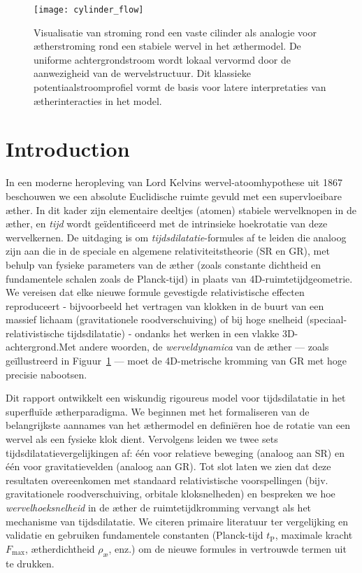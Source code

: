 \begin{figure}[htbp]
    \centering
    \texttt{[image: cylinder\_flow]}
    \caption{Visualisatie van stroming rond een vaste cilinder als analogie voor ætherstroming rond een stabiele wervel in het æthermodel. De uniforme achtergrondstroom wordt lokaal vervormd door de aanwezigheid van de wervelstructuur. Dit klassieke potentiaalstroomprofiel vormt de basis voor latere interpretaties van ætherinteracties in het model.}
    \label{fig:cylinderflow}
\end{figure}

\section{Introduction}
In een moderne heropleving van Lord Kelvins wervel-atoomhypothese uit 1867~\cite{Kelvin1867-vortex} beschouwen we een absolute Euclidische ruimte gevuld met een supervloeibare æther. In dit kader zijn elementaire deeltjes (atomen) stabiele wervelknopen in de æther, en \emph{tijd} wordt geïdentificeerd met de intrinsieke hoekrotatie van deze wervelkernen. De uitdaging is om \emph{tijdsdilatatie}-formules af te leiden die analoog zijn aan die in de speciale en algemene relativiteitstheorie (SR en GR), met behulp van fysieke parameters van de æther (zoals constante dichtheid en fundamentele schalen zoals de Planck-tijd) in plaats van 4D-ruimtetijdgeometrie. We vereisen dat elke nieuwe formule gevestigde relativistische effecten reproduceert - bijvoorbeeld het vertragen van klokken in de buurt van een massief lichaam (gravitationele roodverschuiving) of bij hoge snelheid (speciaal-relativistische tijdsdilatatie) - ondanks het werken in een vlakke 3D-achtergrond.Met andere woorden, de \emph{werveldynamica} van de æther — zoals geïllustreerd in Figuur~\ref{fig:cylinderflow} — moet de 4D-metrische kromming van GR met hoge precisie nabootsen.


Dit rapport ontwikkelt een wiskundig rigoureus model voor tijdsdilatatie in het superfluïde ætherparadigma. We beginnen met het formaliseren van
de belangrijkste aannames van het æthermodel en definiëren hoe de rotatie van een wervel als een fysieke klok dient. Vervolgens leiden we twee
sets tijdsdilatatievergelijkingen af: één voor relatieve beweging (analoog aan SR) en één voor gravitatievelden (analoog aan GR). Tot slot laten we zien dat deze resultaten overeenkomen met standaard relativistische voorspellingen (bijv. gravitationele roodverschuiving, orbitale kloksnelheden) en bespreken we hoe \emph{wervelhoeksnelheid} in de æther de ruimtetijdkromming vervangt als het mechanisme van tijdsdilatatie. We citeren primaire literatuur ter vergelijking en validatie en gebruiken fundamentele constanten (Planck-tijd $t_\textrm{P}$, maximale kracht $F_{\max}$, ætherdichtheid $\rho_{\text{\ae}}$, enz.) om de nieuwe formules in vertrouwde termen uit te drukken.